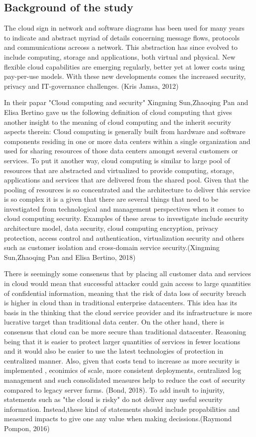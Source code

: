 \documentclass{article}
\begin{document}
\subsection{Background of the study}
The cloud sign in network and software diagrams has been used for many years to indicate and abstract myriad of details concerning message flows, protocols and communications acreoss a network. This abstraction has since evolved to include computing, storage and applications, both virtual and physical. New flexible cloud capabilities are emerging regularly, better yet at lower costs using pay-per-use models. With these new developments comes the increased security, privacy and IT-governance challenges. (Kris Jamsa, 2012)
\par
In their papar "Cloud computing and security" Xingming Sun,Zhaoqing Pan and Elisa Bertino gave us the following definition of cloud computing that gives another insight to the meaning of cloud computing and the inherit security aspects therein: Cloud computing is generally built from hardware and software components residing in one or more data centers within a single organization and used for sharing resources of those data centers amongst several customers or services. To put it another way, cloud computing is similar to large pool of resources that are abstracted and virtualized to provide computing, storage, applications and services that are delivered from the shared pool. Given that the pooling of resources is so concentrated and the architecture to deliver this service is so complex it is a given that there are several things that need to be investigated from technological and management perspectives when it comes to cloud computing security. Examples of these areas to investigate include security architecture model, data security, cloud computing encryption, privacy protection, access control and authentication, virtualization security and others such as customer isolation and cross-domain service security.(Xingming Sun,Zhaoqing Pan and Elisa Bertino, 2018)
\par 
There is seemingly some consensus that by placing all customer data and services in cloud would mean that successful attacker could gain access to large quantities of confidential information, meaning that the risk of data loss of security breach is higher in cloud than in traditional enterprise datacenters. This idea has its basis in the thinking that the cloud service provider and its infrastructure is more lucrative target than traditional data center. On the other hand, there is consensus that cloud can be more secure than traditional datacenter. Reasoning being that it is easier to protect larger quantities of services in fewer locations and it would also be easier to use the latest technologies of protection in centralized manner. Also, given that costs tend to increase as more security is implemented , econimics of scale, more consistent deployments, centralized log management and such consolidated measures help to reduce the cost of security compared to legacy server farms. (Bond, 2018). To add insult to injurity, statements such as "the cloud is risky" do not deliver any useful security information. Instead,these kind of statements should include propabilities and measured impacts to give one any value when making decissions.(Raymond Pompon, 2016) 
\end{document}
